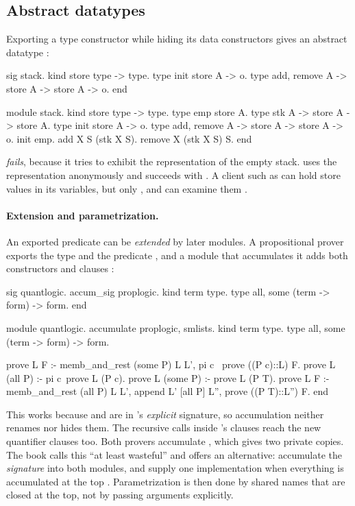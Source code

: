 \subsection{Abstract datatypes}

Exporting a type constructor while hiding its data constructors gives an abstract datatype :
\begin{lprolog}
sig stack.
kind store           type -> type.
type init            store A -> o.
type add, remove     A -> store A -> store A -> o.
end
\end{lprolog}
\begin{lprolog}
module stack.
kind store           type -> type.
type emp             store A.
type stk             A -> store A -> store A.
type init            store A -> o.
type add, remove     A -> store A -> store A -> o.
init emp.
add    X S (stk X S).
remove X (stk X S) S.
end
\end{lprolog}
 \emph{fails}, because it tries to exhibit the representation of the empty stack.
 uses the representation
anonymously and succeeds with  . A client such as  can hold store
values in its variables, but only ,  and  can examine them .

\paragraph{Extension and parametrization.} An exported predicate can be \emph{extended} by later modules.
A propositional prover  exports the type  and the predicate , and a
module  that accumulates it adds both constructors and clauses :
\begin{lprolog}
sig quantlogic.
accum_sig proplogic.
kind term        type.
type all, some   (term -> form) -> form.
end

module quantlogic.
accumulate proplogic, smlists.
kind term        type.
type all, some   (term -> form) -> form.

prove L F :- memb_and_rest (some P) L L',
             pi c \ prove ((P c)::L) F.
prove L (all P) :- pi c\ prove L (P c).
prove L (some P) :- prove L (P T).
prove L F :- memb_and_rest (all P) L L',
             append L' [all P] L'', prove ((P T)::L'') F.
end
\end{lprolog}
This works because  and  are in 's \emph{explicit} signature, so
accumulation neither renames nor hides them. The recursive calls inside 's clauses reach
the new quantifier clauses too. Both provers accumulate , which gives two private copies. The
book calls this ``at least wasteful''  and offers an alternative: accumulate the
\emph{signature}  into both modules, and supply one implementation when everything is
accumulated at the top . Parametrization is then done by shared names that are closed at the
top, not by passing arguments explicitly.

